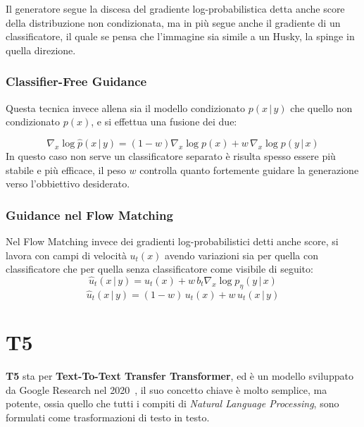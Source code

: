 Il generatore segue la discesa del gradiente log-probabilistica detta anche score della distribuzione non condizionata, ma in più segue anche il gradiente di un classificatore, il quale se pensa che l'immagine sia simile a un Husky, la spinge in quella direzione.

\subsubsection{Classifier-Free Guidance}
Questa tecnica invece allena sia il modello condizionato $p(x\,|\,y)$ che quello non condizionato $p(x)$, e si effettua una fusione dei due:

\begin{equation}
    \nabla_x\log \hat{p}(x\,|\,y) = (1 - w)\nabla_x\log p(x) + w\,\nabla_x \log p (y\,|\,x)
\end{equation}
In questo caso non serve un classificatore separato è risulta spesso essere più stabile e più efficace, il peso $w$ controlla quanto fortemente guidare la generazione verso l'obbiettivo desiderato.

\subsubsection{Guidance nel Flow Matching}
Nel Flow Matching invece dei gradienti log-probabilistici detti anche score, si lavora con campi di velocità $u_t(x)$ avendo variazioni sia per quella con classificatore che per quella senza classificatore come visibile di seguito:
\begin{equation*}
    \hat{u}_t(x\,|\,y) = u_t(x) + w\,b_t\nabla_x \log p_\eta(y\,|\,x)
\end{equation*}
\begin{equation*}
    \hat{u}_t(x\,|\,y) =(1-w)\,u_t(x) + w\,u_t(x\,|\,y)
\end{equation*}

\section{T5}

\textbf{T5} sta per \textbf{Text-To-Text Transfer Transformer}, ed è un modello sviluppato da Google Research nel 2020~\cite{raffel2020t5}, il suo concetto chiave è molto semplice, ma potente, ossia quello che tutti i compiti di \textit{Natural Language Processing}, sono formulati come trasformazioni di testo in testo.

